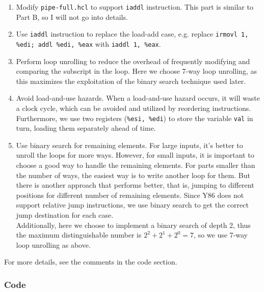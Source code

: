 \documentclass{article}
\begin{document}
\begin{enumerate}
  \item Modify \verb|pipe-full.hcl| to support \verb|iaddl| instruction. This part is similar to Part B, so I will not go into details.
  \item Use \verb|iaddl| instruction to replace the load-add case, e.g. replace \verb|irmovl 1, %edi; addl %edi, %eax| with \verb|iaddl 1, %eax|.
  \item Perform loop unrolling to reduce the overhead of frequently modifying and comparing the subscript in the loop. Here we choose 7-way loop unrolling, as this maximizes the exploitation of the binary search technique used later.
  \item Avoid load-and-use hazards. When a load-and-use hazard occurs, it will waste a clock cycle, which can be avoided and utilized by reordering instructions. Furthermore, we use two registers (\verb|%esi, %edi|) to store the variable \verb|val| in turn, loading them separately ahead of time.
  \item Use binary search for remaining elements. For large inputs, it's better to unroll the loops for more ways. However, for small inputs, it is important to choose a good way to handle the remaining elements. For parts smaller than the number of ways, the easiest way is to write another loop for them. But there is another approach that performs better, that is, jumping to different positions for different number of remaining elements. Since Y86 does not support relative jump instructions, we use binary search to get the correct jump destination for each case. \\
  Additionally, here we choose to implement a binary search of depth 2, thus the maximum distinguishable number is $2^2 + 2^1 + 2^0 = 7$, so we use 7-way loop unrolling as above.
\end{enumerate}

\noindent \noindent For more details, see the comments in the code section.

\subsubsection{Code}
\end{document}
